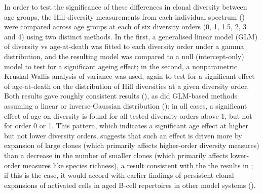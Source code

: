 In order to test the significance of these differences in clonal diversity between age groups, the Hill-diversity measurements from each individual spectrum () were compared across age groups at each of six diversity orders (0, 1, 1.5, 2, 3 and 4) using two distinct methods. In the first, a generalised linear model (GLM) of diversity vs age-at-death was fitted to each diversity order under a gamma distribution, and the resulting model was compared to a null (intercept-only) model to test for a significant ageing effect; in the second, a nonparametric Kruskal-Wallis analysis of variance was used, again to test for a significant effect of age-at-death on the distribution of Hill diversities at a given diversity order. Both results gave roughly consistent results (), as did GLM-based methods assuming a linear or inverse-Gaussian distribution (): in all cases, a significant effect of age on diversity is found for all tested diversity orders above 1, but not for order 0 or 1. This pattern, which indicates a significant age effect at higher but not lower diversity orders, suggests that such an effect is driven more by expansion of large clones (which primarily affects higher-order diversity measures) than a decrease in the number of smaller clones (which primarily affects lower-order measures like species richness), a result consistent with the the results in ; if this is the case, it would accord with earlier findings of persistent clonal expansions of activated cells in aged B-cell repertoires in other model systems ().

